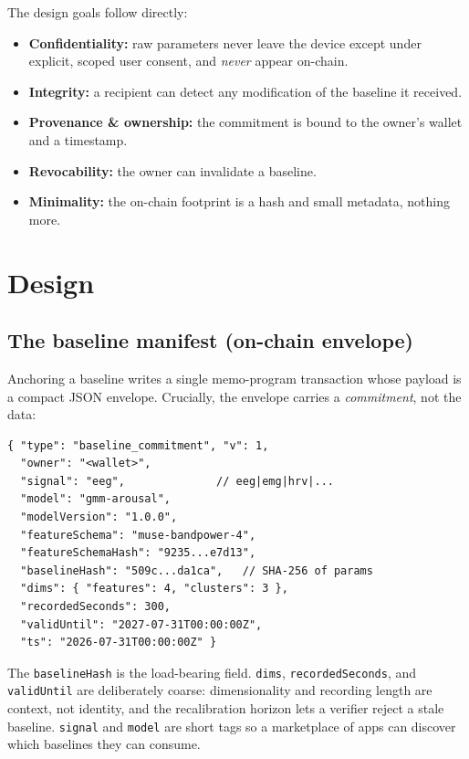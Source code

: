 \documentclass[10pt,twocolumn]{article}
\newcommand{\code}[1]{\texttt{\small #1}}
\begin{document}
The design goals follow directly:
\begin{itemize}
\item \textbf{Confidentiality:} raw parameters never leave the device except
  under explicit, scoped user consent, and \emph{never} appear on-chain.
\item \textbf{Integrity:} a recipient can detect any modification of the
  baseline it received.
\item \textbf{Provenance \& ownership:} the commitment is bound to the owner's
  wallet and a timestamp.
\item \textbf{Revocability:} the owner can invalidate a baseline.
\item \textbf{Minimality:} the on-chain footprint is a hash and small metadata,
  nothing more.
\end{itemize}

\section{Design}

\subsection{The baseline manifest (on-chain envelope)}

Anchoring a baseline writes a single memo-program transaction whose payload is a
compact JSON envelope. Crucially, the envelope carries a \emph{commitment}, not
the data:

\begin{lstlisting}
{ "type": "baseline_commitment", "v": 1,
  "owner": "<wallet>",
  "signal": "eeg",              // eeg|emg|hrv|...
  "model": "gmm-arousal",
  "modelVersion": "1.0.0",
  "featureSchema": "muse-bandpower-4",
  "featureSchemaHash": "9235...e7d13",
  "baselineHash": "509c...da1ca",   // SHA-256 of params
  "dims": { "features": 4, "clusters": 3 },
  "recordedSeconds": 300,
  "validUntil": "2027-07-31T00:00:00Z",
  "ts": "2026-07-31T00:00:00Z" }
\end{lstlisting}

The \code{baselineHash} is the load-bearing field. \code{dims},
\code{recordedSeconds}, and \code{validUntil} are deliberately coarse:
dimensionality and recording length are context, not identity, and the
recalibration horizon lets a verifier reject a stale baseline. \code{signal} and
\code{model} are short tags so a marketplace of apps can discover which baselines
they can consume.
\end{document}
